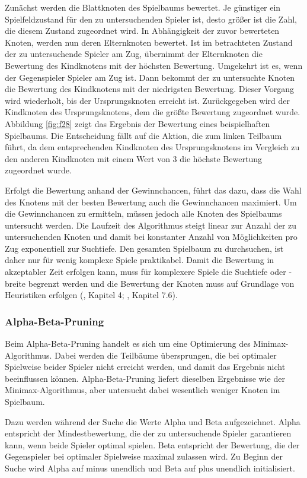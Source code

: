 Zunächst werden die Blattknoten des Spielbaums bewertet. Je günstiger ein Spielfeldzustand für den zu untersuchenden Spieler ist, desto größer ist die Zahl, die diesem Zustand zugeordnet wird. In Abhängigkeit der zuvor bewerteten Knoten, werden nun deren Elternknoten bewertet. Ist im betrachteten Zustand der zu untersuchende Spieler am Zug, übernimmt der Elternknoten die Bewertung des Kindknotens mit der höchsten Bewertung. Umgekehrt ist es, wenn der Gegenspieler Spieler am Zug ist. Dann bekommt der zu untersuchte Knoten die Bewertung des Kindknotens mit der niedrigsten Bewertung. Dieser Vorgang wird wiederholt, bis der Ursprungsknoten erreicht ist. Zurückgegeben wird der Kindknoten des Ursprungsknotens, dem die größte Bewertung zugeordnet wurde. Abbildung \ref{fig:f28} zeigt das Ergebnis der Bewertung eines beispielhaften Spielbaums. Die Entscheidung fällt auf die Aktion, die zum linken Teilbaum führt, da dem entsprechenden Kindknoten des Ursprungsknotens im Vergleich zu den anderen Kindknoten mit einem Wert von 3 die höchste Bewertung zugeordnet wurde.

Erfolgt die Bewertung anhand der Gewinnchancen, führt das dazu, dass die Wahl des Knotens mit der besten Bewertung auch die Gewinnchancen maximiert. Um die Gewinnchancen zu ermitteln, müssen jedoch alle Knoten des Spielbaums untersucht werden. Die Laufzeit des Algorithmus steigt linear zur Anzahl der zu untersuchenden Knoten und damit bei konstanter Anzahl von Möglichkeiten pro Zug exponentiell zur Suchtiefe. Den gesamten Spielbaum zu durchsuchen, ist daher nur für wenig komplexe Spiele praktikabel. Damit die Bewertung in akzeptabler Zeit erfolgen kann, muss für komplexere Spiele die Suchtiefe oder -breite begrenzt werden und die Bewertung der Knoten muss auf Grundlage von Heuristiken erfolgen (\cite{Ferguson.January2019}, Kapitel 4; \cite{Heineman.October2008}, Kapitel 7.6).

\subsubsection{Alpha-Beta-Pruning}

Beim Alpha-Beta-Pruning handelt es sich um eine Optimierung des Minimax-Algorithmus. Dabei werden die Teilbäume übersprungen, die bei optimaler Spielweise beider Spieler nicht erreicht werden, und damit das Ergebnis nicht beeinflussen können. Alpha-Beta-Pruning liefert dieselben Ergebnisse wie der Minimax-Algorithmus, aber untersucht dabei wesentlich weniger Knoten im Spielbaum.

Dazu werden während der Suche die Werte Alpha und Beta aufgezeichnet. Alpha entspricht der Mindestbewertung, die der zu untersuchende Spieler garantieren kann, wenn beide Spieler optimal spielen. Beta entspricht der Bewertung, die der Gegenspieler bei optimaler Spielweise maximal zulassen wird. Zu Beginn der Suche wird Alpha auf minus unendlich und Beta auf plus unendlich initialisiert.

